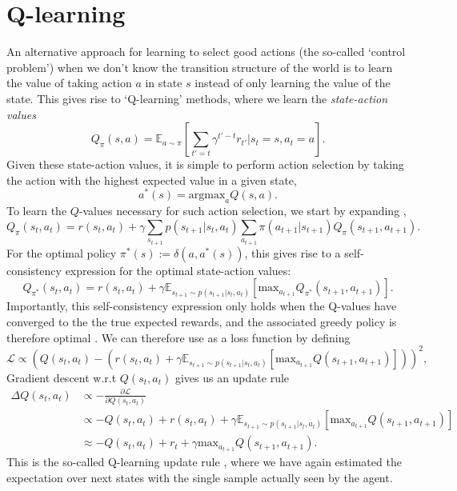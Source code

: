 \section{Q-learning}
\label{sec:q_learning}

An alternative approach for learning to select good actions (the so-called `control problem') when we don't know the transition structure of the world is to learn the value of taking action $a$ in state $s$ instead of only learning the value of the state.
This gives rise to `Q-learning' methods, where we learn the \emph{state-action values}
\begin{equation}
    \label{eq:Q-values}
    Q_\pi(s,a) =  \mathbb{E}_{a \sim \pi} \left [ \sum_{t'=t} \gamma^{t' - t} r_{t'} | s_{t} = s, a_{t} = a \right ].
\end{equation}
Given these state-action values, it is simple to perform action selection by taking the action with the highest expected value in a given state,
\begin{equation}
    a^*(s) = \text{argmax}_{a} Q(s, a).
\end{equation}
To learn the $Q$-values necessary for such action selection, we start by expanding ,
\begin{equation}
    \label{eq:Q-expanded}
    Q_\pi(s_t,a_t) =  r(s_t, a_t) + \gamma \sum_{s_{t+1}} p(s_{t+1} | s_t, a_t) \sum_{a_{t+1}} \pi(a_{t+1} | s_{t+1}) Q_\pi(s_{t+1}, a_{t+1}).
\end{equation}
For the optimal policy $\pi^*(s) := \delta(a, a^*(s))$, this gives rise to a self-consistency expression for the optimal state-action values:
\begin{equation}
    \label{eq:Q-optimal}
    Q_{\pi^*}(s_t,a_t) =  r(s_t, a_t) + \gamma \mathbb{E}_{s_{t+1} \sim p(s_{t+1} | s_t, a_t)} \left [ \text{max}_{a_{t+1}} Q_{\pi^*}(s_{t+1}, a_{t+1}) \right ].
\end{equation}
Importantly, this self-consistency expression only holds when the Q-values have converged to the the true expected rewards, and the associated greedy policy is therefore optimal \citep{sutton2018reinforcement}.
We can therefore use  as a loss function by defining
\begin{equation}
    \mathcal{L} \propto \left (  Q(s_t,a_t) - (r(s_t, a_t) + \gamma \mathbb{E}_{s_{t+1} \sim p(s_{t+1} | s_t, a_t)} \left [ \text{max}_{a_{t+1}} Q(s_{t+1}, a_{t+1}) \right ] ) \right )^2,
\end{equation}
Gradient descent w.r.t $Q(s_t,a_t)$ gives us an update rule
\begin{align}
    \Delta  Q(s_t,a_t) & \propto - \frac{\partial \mathcal{L}}{\partial  Q(s_t,a_t)}\\
    &\propto - Q(s_t,a_t) + r(s_t, a_t) + \gamma \mathbb{E}_{s_{t+1} \sim p(s_{t+1} | s_t, a_t)} \left [ \text{max}_{a_{t+1}} Q(s_{t+1}, a_{t+1}) \right ] \\
    &\approx - Q(s_t,a_t) + r_t + \gamma \text{max}_{a_{t+1}} Q(s_{t+1}, a_{t+1}).
\end{align}
This is the so-called Q-learning update rule \citep{watkins1989learning}, where we have again estimated the expectation over next states with the single sample actually seen by the agent.

